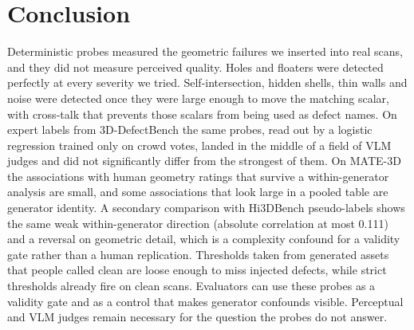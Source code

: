\section{Conclusion}
\label{sec:conc}

Deterministic probes measured the geometric failures we inserted into real scans, and they did not measure perceived quality.
Holes and floaters were detected perfectly at every severity we tried.
Self-intersection, hidden shells, thin walls and noise were detected once they were large enough to move the matching scalar, with cross-talk that prevents those scalars from being used as defect names.
On expert labels from 3D-DefectBench the same probes, read out by a logistic regression trained only on crowd votes, landed in the middle of a field of VLM judges and did not significantly differ from the strongest of them.
On MATE-3D the associations with human geometry ratings that survive a within-generator analysis are small, and some associations that look large in a pooled table are generator identity.
A secondary comparison with Hi3DBench pseudo-labels shows the same weak within-generator direction (absolute correlation at most 0.111) and a reversal on geometric detail, which is a complexity confound for a validity gate rather than a human replication.
Thresholds taken from generated assets that people called clean are loose enough to miss injected defects, while strict thresholds already fire on clean scans.
Evaluators can use these probes as a validity gate and as a control that makes generator confounds visible.
Perceptual and VLM judges remain necessary for the question the probes do not answer.
